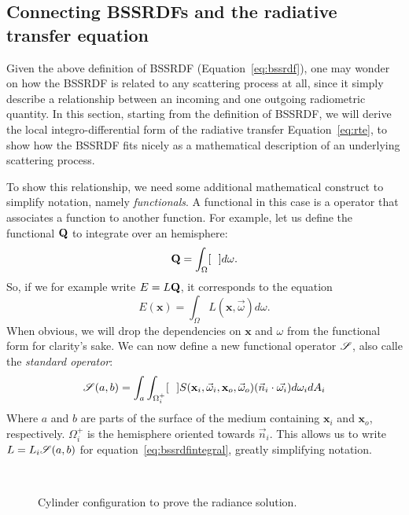 \subsection{Connecting BSSRDFs and the radiative transfer equation}

Given the above definition of BSSRDF (Equation~\ref{eq:bssrdf}), one may wonder on how the BSSRDF is related to any scattering process at all, since it simply describe a relationship between an incoming and one outgoing radiometric quantity. In this section, starting from the definition of BSSRDF, we will derive the local integro-differential form of the radiative transfer Equation~\ref{eq:rte}, to show how the BSSRDF fits nicely as a mathematical description of an underlying scattering process. 

To show this relationship, we need some additional mathematical construct to simplify notation, namely \emph{functionals}. A functional in this case is a operator that associates a function to another function. For example, let us define the functional $\mathbf{Q}$ to integrate over an hemisphere:
\begin{equation*}
\operator{Q} = \int_\Omega [\ \ ] d\omega.
\end{equation*}
So, if we for example write $E = L\mathbf{Q}$, it corresponds to the equation
\begin{equation*}
E(\mathbf{x}) = \int_\Omega L(\mathbf{x}, \vec{\omega}) d\omega.
\end{equation*}
When obvious, we will drop the dependencies on $\mathbf{x}$ and $\omega$ from the functional form for clarity's sake. We can now define a new functional operator $\mathscr{S}$, also calle the \emph{standard operator}:
\begin{equation*}
\mathscr{S}(a,b) = \int_a \int_{\Omega_i^+} [\ \ ] S(\mathbf{x}_i, \vec{\omega}_i, \mathbf{x}_o, \vec{\omega}_o) (\vec{n}_i \cdot \vec{\omega_i}) d \omega_i d A_i
\end{equation*}
Where $a$ and $b$ are parts of the surface of the medium containing $\mathbf{x}_i$ and $\mathbf{x}_o$, respectively. $\Omega_i^+$ is the hemisphere oriented towards $\vec{n}_i$. This allows us to write $L = L_i \mathscr{S}(a,b)$ for equation~\ref{eq:bssrdfintegral}, greatly simplifying notation.

\begin{figure}
\centering
   \def\svgwidth{0.8\textwidth}
    \\
\caption{Cylinder configuration to prove the radiance solution.} %
\label{fig:cylinder}
\end{figure}

